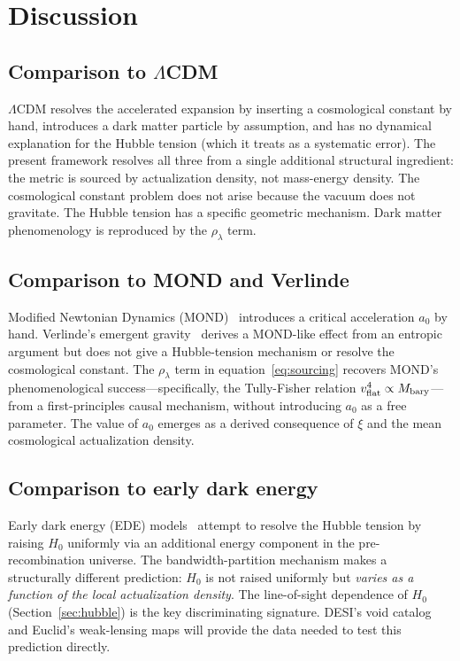 \documentclass[11pt,twocolumn]{article}
\theoremstyle{plain}
\theoremstyle{remark}
\begin{document}
\section{Discussion}
\label{sec:discussion}

\subsection{Comparison to $\Lambda$CDM}

$\Lambda$CDM resolves the accelerated expansion by inserting a
cosmological constant by hand, introduces a dark matter particle
by assumption, and has no dynamical explanation for the Hubble
tension (which it treats as a systematic error).
The present framework resolves all three from a single additional
structural ingredient: the metric is sourced by actualization
density, not mass-energy density.
The cosmological constant problem does not arise because the vacuum
does not gravitate.
The Hubble tension has a specific geometric mechanism.
Dark matter phenomenology is reproduced by the $\rho_\lambda$ term.

\subsection{Comparison to MOND and Verlinde}

Modified Newtonian Dynamics (MOND)~\cite{Milgrom1983} introduces a
critical acceleration $a_0$ by hand.
Verlinde's emergent gravity~\cite{Verlinde2017} derives a MOND-like
effect from an entropic argument but does not give a Hubble-tension
mechanism or resolve the cosmological constant.
The $\rho_\lambda$ term in equation~\eqref{eq:sourcing} recovers
MOND's phenomenological success---specifically, the Tully-Fisher
relation $v_{\rm flat}^4 \propto M_{\rm bary}$---from a first-principles
causal mechanism, without introducing $a_0$ as a free parameter.
The value of $a_0$ emerges as a derived consequence of
$\xi$ and the mean cosmological actualization density.

\subsection{Comparison to early dark energy}

Early dark energy (EDE) models~\cite{Poulin2019} attempt to resolve
the Hubble tension by raising $H_0$ uniformly via an additional
energy component in the pre-recombination universe.
The bandwidth-partition mechanism makes a structurally different
prediction: $H_0$ is not raised uniformly but \emph{varies as a
function of the local actualization density}.
The line-of-sight dependence of $H_0$ (Section~\ref{sec:hubble})
is the key discriminating signature.
DESI's void catalog and Euclid's weak-lensing maps will provide
the data needed to test this prediction directly.
\end{document}
